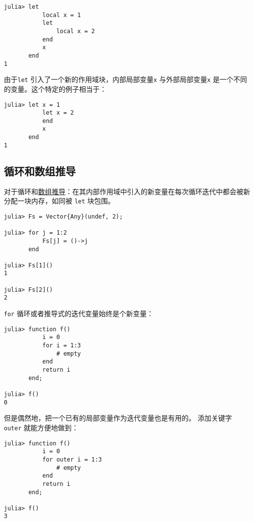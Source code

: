 \begin{verbatim}
julia> let
           local x = 1
           let
               local x = 2
           end
           x
       end
1
\end{verbatim}



由于\texttt{let} 引入了一个新的作用域块，内部局部变量\texttt{x} 与外部局部变量\texttt{x} 是一个不同的变量。这个特定的例子相当于：




\begin{verbatim}
julia> let x = 1
           let x = 2
           end
           x
       end
1
\end{verbatim}



\hypertarget{3992679446378106754}{}


\subsection{循环和数组推导}



对于循环和\hyperlink{3967134426571365188}{数组推导}：在其内部作用域中引入的新变量在每次循环迭代中都会被新分配一块内存，如同被 \texttt{let} 块包围。




\begin{verbatim}
julia> Fs = Vector{Any}(undef, 2);

julia> for j = 1:2
           Fs[j] = ()->j
       end

julia> Fs[1]()
1

julia> Fs[2]()
2
\end{verbatim}



\texttt{for} 循环或者推导式的迭代变量始终是个新变量：




\begin{lstlisting}
julia> function f()
           i = 0
           for i = 1:3
               # empty
           end
           return i
       end;

julia> f()
0
\end{lstlisting}



但是偶然地，把一个已有的局部变量作为迭代变量也是有用的。 添加关键字 \texttt{outer} 就能方便地做到：




\begin{verbatim}
julia> function f()
           i = 0
           for outer i = 1:3
               # empty
           end
           return i
       end;

julia> f()
3
\end{verbatim}



